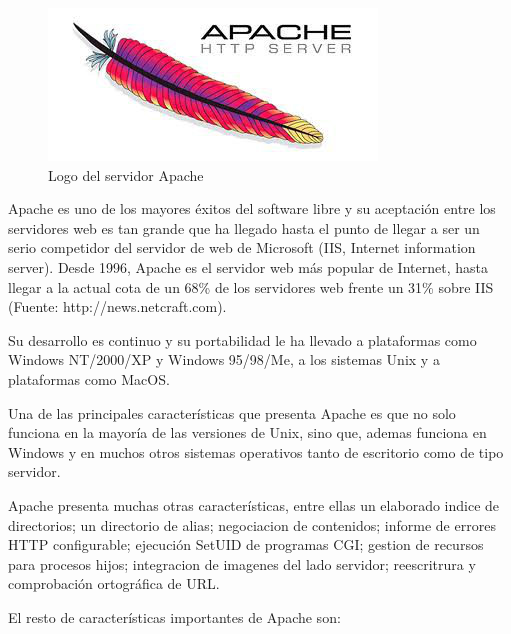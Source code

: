 \begin{figure}[h]
    \centering
    \includegraphics{imagenes/apache_logo.jpg}
    \caption{Logo del servidor Apache}
    \label{fig:logoapache}
\end{figure}

Apache es uno de los mayores éxitos del software libre y su aceptación entre los servidores web es tan grande que ha llegado hasta el punto de llegar a ser un serio competidor del servidor de web de Microsoft (IIS, Internet information server). Desde 1996, Apache es el servidor web más popular de Internet, hasta llegar a la actual cota de un 68\% de los servidores web frente un 31\% sobre IIS (Fuente: http://news.netcraft.com).

 Su desarrollo es continuo y su portabilidad le ha llevado a plataformas como Windows NT/2000/XP y Windows 95/98/Me,
a los sistemas Unix y a plataformas como MacOS. 

Una de las principales características que presenta Apache es que no solo funciona en la mayoría de las versiones de Unix, sino que, ademas funciona en Windows y en muchos otros sistemas operativos tanto de escritorio como de tipo servidor.

Apache presenta muchas otras características, entre ellas un elaborado indice de directorios; un directorio de alias; negociacion de contenidos; informe de errores HTTP configurable; ejecución SetUID de programas CGI; gestion de recursos para procesos hijos; integracion de imagenes del lado servidor; reescritrura y comprobación ortográfica de URL.

El resto de características importantes de Apache son:

